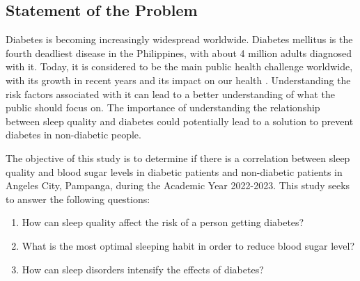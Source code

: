 \subsection*{Statement of the Problem}

Diabetes is becoming increasingly widespread worldwide. Diabetes mellitus is the
fourth deadliest disease in the Philippines, with about 4 million adults
diagnosed with it. Today, it is considered to be the main public health
challenge worldwide, with its growth in recent years and its impact on our
health \parencite{cudis-2021}. Understanding the risk factors associated with it
can lead to a better understanding of what the public should focus on. The
importance of understanding the relationship between sleep quality and diabetes
could potentially lead to a solution to prevent diabetes in non-diabetic people.


The objective of this study is to determine if there is a correlation between
sleep quality and blood sugar levels in diabetic patients and non-diabetic
patients in Angeles City, Pampanga, during the Academic Year 2022-2023. This
study seeks to answer the following questions:

\begin{enumerate}
    \item How can sleep quality affect the risk of a person getting diabetes?
    \item What is the most optimal sleeping habit in order to reduce blood sugar
level?
    \item How can sleep disorders intensify the effects of diabetes?
\end{enumerate}
